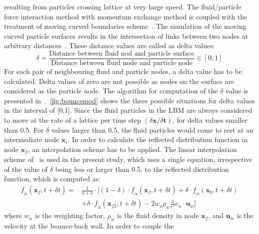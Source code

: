 resulting from particles crossing lattice at very large speed. The 
fluid/particle force interaction method with momentum exchange method is 
coupled with the treatment of moving curved boundaries scheme~\citep{Yu2003}. 
The simulation of the moving curved particle surfaces results in the 
intersection of links between two nodes at arbitrary 
distances~\citep{Iglberger2008}. These distance values are called as delta 
values:
%
\begin{equation}
\delta = \frac{\mbox{Distance between fluid nod and particle 
surface}}{\mbox{Distance between fluid node and particle node}} \in [0,1]
\end{equation} 
%
For each pair of neighbouring fluid and particle nodes, a delta value has to be 
calculated. Delta values of zero are not possible as nodes on the surface are 
considered as the particle node. The algorithm for computation of the $\delta$ 
value is presented in~\citet{Iglberger2008}.~\cref{fig:bouncemod} shows the 
three possible situations for delta values in the interval of [0,1]. Since the 
fluid particles in the LBM are always considered to move at the rate of a 
lattice per time step $(\delta \mathbf{x}/ \delta \mathbf{t})$, for delta 
values smaller than 0.5. For $\delta$ values larger than 0.5, the fluid 
particles would come to rest at an intermediate node $\mathbf{x}_{\mathit{i}}$. 
In order to calculate the reflected distribution function in node 
$\mathbf{x}_{\mathit{f}}$, an interpolation scheme has to be applied. The 
linear interpolation scheme of~\citet{Yu2003} is used in the present study, 
which uses a single equation, irrespective of the value of $\delta$ being less 
or larger than 0.5, to the reflected distribution function, which is computed 
as:
%
\begin{align}
 \nonumber
\mathit{\mathit{f}}_{\overline{\alpha}}(\mathbf{x}_{\mathit{f}},t + \delta t) = 
& \frac{1}{1 + \delta} \cdot [(1-\delta)\cdot 
\mathit{\mathit{f}}_{\alpha}(\mathbf{x}_{\mathit{f}},t + \delta t) + \delta 
\cdot \mathit{\mathit{f}}_{\alpha}(\mathbf{x}_{\mathit{b}},t + \delta t)  \\
& + \delta \cdot 
\mathit{\mathit{f}}_{\overline{\alpha}}(\mathbf{x}_{\mathit{f2}},t + \delta t) 
-2\mathit{w}_{\mathit{a}}\rho_{\mathit{w}}\frac{3}{\mathit{c}^{2}}\mathbf{\mathit{e}}_{\mathit{a}}\cdot
 \mathbf{u}_{\mathit{w}}]
\end{align}
%
where $\mathit{w}_{\alpha}$ is the weighting factor, $\rho_{\mathit{w}}$ is the 
fluid density in node $\mathbf{x}_{\mathit{f}}$, and $ \mathbf{u}_{\mathit{w}}  
$ is the velocity at the bounce-back wall. In order to couple the 
